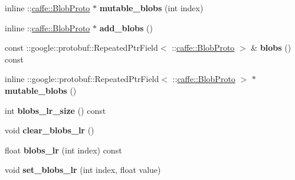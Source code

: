 \begin{DoxyCompactItemize}
\item 
\mbox{\label{classcaffe_1_1_v0_layer_parameter_a45c7503b32b05515088925653c9ae04b}} 
inline \+::\mbox{\hyperlink{classcaffe_1_1_blob_proto}{caffe\+::\+Blob\+Proto}} $\ast$ {\bfseries mutable\+\_\+blobs} (int index)
\item 
\mbox{\label{classcaffe_1_1_v0_layer_parameter_acdfd1d32e5fc8789d9147c7abd532d3f}} 
inline \+::\mbox{\hyperlink{classcaffe_1_1_blob_proto}{caffe\+::\+Blob\+Proto}} $\ast$ {\bfseries add\+\_\+blobs} ()
\item 
\mbox{\label{classcaffe_1_1_v0_layer_parameter_a106c3c97e1c286ae7e7c1476a1cde411}} 
const \+::google\+::protobuf\+::\+Repeated\+Ptr\+Field$<$ \+::\mbox{\hyperlink{classcaffe_1_1_blob_proto}{caffe\+::\+Blob\+Proto}} $>$ \& {\bfseries blobs} () const
\item 
\mbox{\label{classcaffe_1_1_v0_layer_parameter_aaa57113729312ac016c328e32e326129}} 
inline \+::google\+::protobuf\+::\+Repeated\+Ptr\+Field$<$ \+::\mbox{\hyperlink{classcaffe_1_1_blob_proto}{caffe\+::\+Blob\+Proto}} $>$ $\ast$ {\bfseries mutable\+\_\+blobs} ()
\item 
\mbox{\label{classcaffe_1_1_v0_layer_parameter_a7ab076ab3bcb72e9f088cbc7214a4631}} 
int {\bfseries blobs\+\_\+lr\+\_\+size} () const
\item 
\mbox{\label{classcaffe_1_1_v0_layer_parameter_a622a4b4bd76826cf3f0439e8146c8699}} 
void {\bfseries clear\+\_\+blobs\+\_\+lr} ()
\item 
\mbox{\label{classcaffe_1_1_v0_layer_parameter_a7bec2c4beb6cbcbbced7aea2405f8206}} 
float {\bfseries blobs\+\_\+lr} (int index) const
\item 
\mbox{\label{classcaffe_1_1_v0_layer_parameter_a6808c566510961daddc12dfac8819ee0}} 
void {\bfseries set\+\_\+blobs\+\_\+lr} (int index, float value)
\item 
\mbox{\label{classcaffe_1_1_v0_layer_parameter_aeca0355623adb3a6d7432f121f155b76}} 

\end{DoxyCompactItemize}
